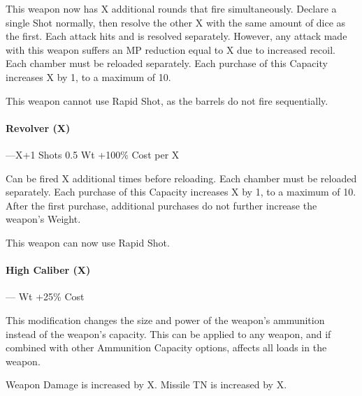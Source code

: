 \documentclass[oneside,11pt,english]{book}
\begin{document}
This weapon now has X additional rounds that fire simultaneously. Declare a single Shot normally, then resolve the other X with the same amount of dice as the first.
Each attack hits and is resolved separately. However, any attack made with this weapon suffers an MP reduction equal to X due to increased recoil. Each chamber must be reloaded separately. Each purchase of this Capacity increases X by 1, to a maximum of 10.

This weapon cannot use Rapid Shot, as the barrels do not fire sequentially. 

\paragraph{Revolver (X)}---\quad X+1 Shots 0.5 Wt +100\% Cost per X

Can be fired X additional times before reloading. Each chamber must be reloaded separately. Each purchase of this Capacity increases X by 1, to a maximum of 10. 
After the first purchase, additional purchases do not further increase the weapon’s Weight. 

This weapon can now use Rapid Shot. 

\paragraph{High Caliber (X)}--- Wt +25\% Cost

This modification changes the size and power of the weapon’s ammunition instead of the weapon’s capacity. This can be applied to any weapon, and if combined with other Ammunition Capacity options, affects all loads in the weapon.

Weapon Damage is increased by X. Missile TN is increased by X.
\end{document}
